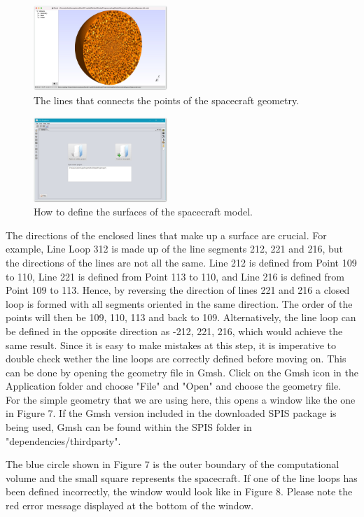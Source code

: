 \documentclass[a4paper, 11pt]{article}
\begin{document}
\begin{figure}[!ht]
    \centering
    \includegraphics[width=0.45\textwidth]{fig5.jpg}
    \caption{The lines that connects the points of the spacecraft geometry.}
\end{figure}

\begin{figure}[!ht]
    \centering
    \includegraphics[width=0.45\textwidth]{fig6.jpg}
    \caption{How to define the surfaces of the spacecraft model.}
\end{figure}

The directions of the enclosed lines that make up a surface are crucial. For example, Line Loop 312 is made up of the line segments 212, 221 and 216, but the directions of the lines are not all the same. Line 212 is defined from Point 109 to 110, Line 221 is defined from Point 113 to 110, and Line 216 is defined from Point 109 to 113. Hence, by reversing the direction of lines 221 and 216 a closed loop is formed with all segments oriented in the same direction. The order of the points will then be 109, 110, 113 and back to 109. Alternatively, the line loop can be defined in the opposite direction as {-212, 221, 216}, which would achieve the same result. Since it is easy to make mistakes at this step, it is imperative to double check wether the line loops are correctly defined before moving on. This can be done by opening the geometry file in Gmsh. Click on the Gmsh icon in the Application folder and choose "File" and "Open" and choose the geometry file. For the simple geometry that we are using here, this opens a window like the one in Figure 7. If the Gmsh version included in the downloaded SPIS package is being used, Gmsh can be found within the SPIS folder in "dependencies/thirdparty".\par
The blue circle shown in Figure 7 is the outer boundary of the computational volume and the small square represents the spacecraft. If one of the line loops has been defined incorrectly, the window would look like in Figure 8. Please note the red error message displayed at the bottom of the window.
\end{document}
